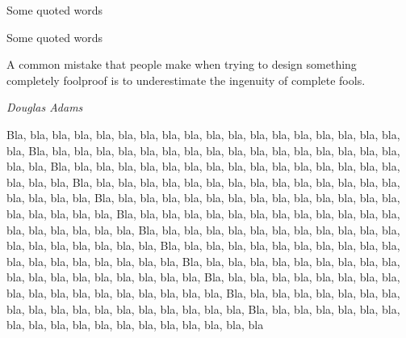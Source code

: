 \documentclass[12pt]{article}
\begin{document}
	\begin{shadequote}
		Some quoted words
	\end{shadequote}

	\begin{shadequote*}
		Some quoted words
	\end{shadequote*}

	\begin{shadequote}
		A common mistake that people make when trying to design something
		completely foolproof is to underestimate the ingenuity of complete fools.
		
		\par \noindent \emph{Douglas Adams}
	\end{shadequote}


	Bla, bla, bla, bla, bla, bla, bla, bla, bla, bla, bla, bla, bla, bla, bla, bla, bla, bla, bla,
	Bla, bla, bla, bla, bla, bla, bla, bla, bla, bla, bla, bla, bla, bla, bla, bla, bla, bla, bla,
	Bla, bla, bla, bla, bla, bla, bla, bla, bla, bla, bla, bla, bla, bla, bla, bla, bla, bla, bla,
	Bla, bla, bla, bla, bla, bla, bla, bla, bla, bla, bla, bla, bla, bla, bla, bla, bla, bla, bla,
	Bla, bla, bla, bla, bla, bla, bla, bla, bla, bla, bla, bla, bla, bla, bla, bla, bla, bla, bla,
	Bla, bla, bla, bla, bla, bla, bla, bla, bla, bla, bla, bla, bla, bla, bla, bla, bla, bla, bla,
	Bla, bla, bla, bla, bla, bla, bla, bla, bla, bla, bla, bla, bla, bla, bla, bla, bla, bla, bla,
	Bla, bla, bla, bla, bla, bla, bla, bla, bla, bla, bla, bla, bla, bla, bla, bla, bla, bla, bla,
	Bla, bla, bla, bla, bla, bla, bla, bla, bla, bla, bla, bla, bla, bla, bla, bla, bla, bla, bla,
	Bla, bla, bla, bla, bla, bla, bla, bla, bla, bla, bla, bla, bla, bla, bla, bla, bla, bla, bla,
	Bla, bla, bla, bla, bla, bla, bla, bla, bla, bla, bla, bla, bla, bla, bla, bla, bla, bla, bla,
	Bla, bla, bla, bla, bla, bla, bla, bla, bla, bla, bla, bla, bla, bla, bla, bla, bla, bla, bla
\end{document}
